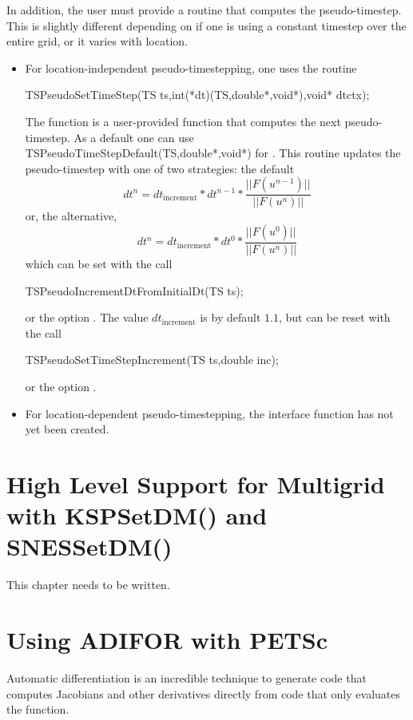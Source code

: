 In addition, the user must provide a routine that computes the
pseudo-timestep. This is slightly different depending on if
one is using a constant timestep over the entire grid, or it varies
with location.
\begin{itemize}
\item For location-independent pseudo-timestepping, one uses the routine
\begin{tabbing}
 TSPseudoSetTimeStep(TS ts,int(*dt)(TS,double*,void*),void* dtctx);
\end{tabbing}
The function  is a user-provided function that computes the next
pseudo-timestep. As a default one can use
TSPseudoTimeStepDefault(TS,double*,void*) for . This routine
updates the pseudo-timestep with one of two strategies: the default
\[
   dt^{n} = dt_{\mathrm{increment}}*dt^{n-1}*\frac{|| F(u^{n-1}) ||}{|| F(u^{n})||}
\]
or, the alternative,
\[
   dt^{n} = dt_{\mathrm{increment}}*dt^{0}*\frac{|| F(u^{0}) ||}{|| F(u^{n})||}
\]
which can be set with the call
\begin{tabbing}
 TSPseudoIncrementDtFromInitialDt(TS ts);
\end{tabbing}
or
the option .
The value $ dt_{\mathrm{increment}} $ is by default $ 1.1$, but can be reset with the
call
\begin{tabbing}
 TSPseudoSetTimeStepIncrement(TS ts,double inc);
\end{tabbing}
or  the option
. 


\item For location-dependent pseudo-timestepping, the interface function
      has not yet been created.
\end{itemize}



\cleardoublepage
\chapter{High Level Support for Multigrid with KSPSetDM() and SNESSetDM()}
\label{chapter_kspdm}

This chapter needs to be written.


\cleardoublepage
\chapter{Using ADIFOR with PETSc}

Automatic differentiation is an incredible technique to generate code
that computes Jacobians and other derivatives directly from code
that only evaluates the function.

